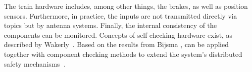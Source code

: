 The train hardware includes, among other things, the brakes, as well as position sensors.
Furthermore, in practice, the inputs are not transmitted directly via  topics but by antenna systems.
Finally, the internal consistency of the components can be monitored.
Concepts of self-checking hardware exist, as described by Wakerly~\cite{SelfCheckingProcessorDesign}.
Based on the results from Bijsma \etal,  can be applied together with component checking methods to extend the system's distributed safety mechanisms~\cite{DistributedSafety2020}.